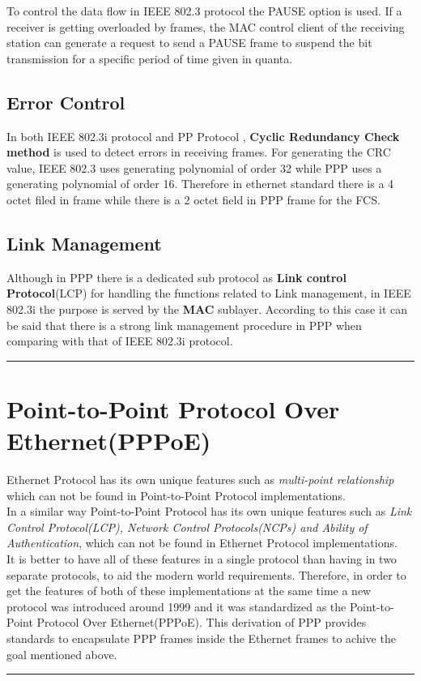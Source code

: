 \documentclass[a4paper,11pt]{article}%
\begin{document}
To control the data flow in IEEE 802.3 protocol the PAUSE option is used. If a receiver is getting overloaded by frames, the MAC control client of the receiving station can generate a request to send a PAUSE frame to suspend the bit transmission for a specific period of time given in quanta. 

\subsection{Error Control}

In both IEEE 802.3i protocol and PP Protocol , \textbf{Cyclic Redundancy Check method} is used to detect errors in receiving frames. For generating the CRC value, IEEE 802.3 uses generating polynomial of order 32 while PPP uses a generating polynomial of order 16. Therefore in ethernet standard there is a 4 octet filed in frame while there is a 2 octet field in PPP frame for the FCS.

\subsection{Link Management}

Although in PPP there is a dedicated sub protocol as \textbf{Link control Protocol}(LCP) for handling the functions related to Link management, in IEEE 802.3i the purpose is served by the \textbf{MAC} sublayer. According to this case it can be said that there is a strong link management procedure in PPP when comparing with that of IEEE 802.3i protocol.\\[3cm]

\hrule
\section{Point-to-Point Protocol Over Ethernet(PPPoE)}

Ethernet Protocol has its own unique features such as \textit{multi-point relationship} which can not be found in Point-to-Point Protocol implementations. \\

In a similar way Point-to-Point Protocol has its own unique features such as \textit{Link Control Protocol(LCP), Network Control Protocols(NCPs) and Ability of Authentication},  which can not be found in Ethernet Protocol implementations.\\


It is better to have all of these  features in a single protocol than having in two separate protocols, to aid the modern world requirements. Therefore, in order to get the features of both of these implementations at the same time a new protocol was introduced around 1999 and it was standardized as the Point-to-Point Protocol Over Ethernet(PPPoE)\cite{pppoe}. This  derivation of PPP provides standards to encapsulate PPP frames inside the Ethernet frames to achive the goal mentioned above.\\[3cm] 




\hrule
% 

\end{document}
